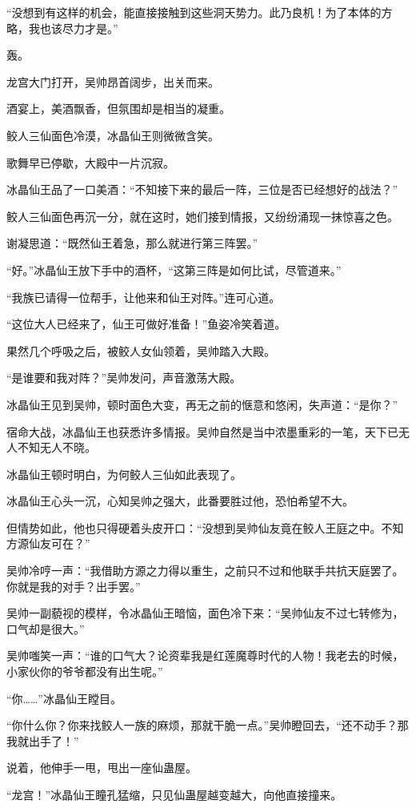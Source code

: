 \begin{this_body}
“没想到有这样的机会，能直接接触到这些洞天势力。此乃良机！为了本体的方略，我也该尽力才是。”

轰。

龙宫大门打开，吴帅昂首阔步，出关而来。

酒宴上，美酒飘香，但氛围却是相当的凝重。

鲛人三仙面色冷漠，冰晶仙王则微微含笑。

歌舞早已停歇，大殿中一片沉寂。

冰晶仙王品了一口美酒：“不知接下来的最后一阵，三位是否已经想好的战法？”

鲛人三仙面色再沉一分，就在这时，她们接到情报，又纷纷涌现一抹惊喜之色。

谢凝思道：“既然仙王着急，那么就进行第三阵罢。”

“好。”冰晶仙王放下手中的酒杯，“这第三阵是如何比试，尽管道来。”

“我族已请得一位帮手，让他来和仙王对阵。”连可心道。

“这位大人已经来了，仙王可做好准备！”鱼姿冷笑着道。

果然几个呼吸之后，被鲛人女仙领着，吴帅踏入大殿。

“是谁要和我对阵？”吴帅发问，声音激荡大殿。

冰晶仙王见到吴帅，顿时面色大变，再无之前的惬意和悠闲，失声道：“是你？”

宿命大战，冰晶仙王也获悉许多情报。吴帅自然是当中浓墨重彩的一笔，天下已无人不知无人不晓。

冰晶仙王顿时明白，为何鲛人三仙如此表现了。

冰晶仙王心头一沉，心知吴帅之强大，此番要胜过他，恐怕希望不大。

但情势如此，他也只得硬着头皮开口：“没想到吴帅仙友竟在鲛人王庭之中。不知方源仙友可在？”

吴帅冷哼一声：“我借助方源之力得以重生，之前只不过和他联手共抗天庭罢了。你就是我的对手？出手罢。”

吴帅一副藐视的模样，令冰晶仙王暗恼，面色冷下来：“吴帅仙友不过七转修为，口气却是很大。”

吴帅嗤笑一声：“谁的口气大？论资辈我是红莲魔尊时代的人物！我老去的时候，小家伙你的爷爷都没有出生呢。”

“你……”冰晶仙王瞠目。

“你什么你？你来找鲛人一族的麻烦，那就干脆一点。”吴帅瞪回去，“还不动手？那我就出手了！”

说着，他伸手一甩，甩出一座仙蛊屋。

“龙宫！”冰晶仙王瞳孔猛缩，只见仙蛊屋越变越大，向他直接撞来。


\end{this_body}

